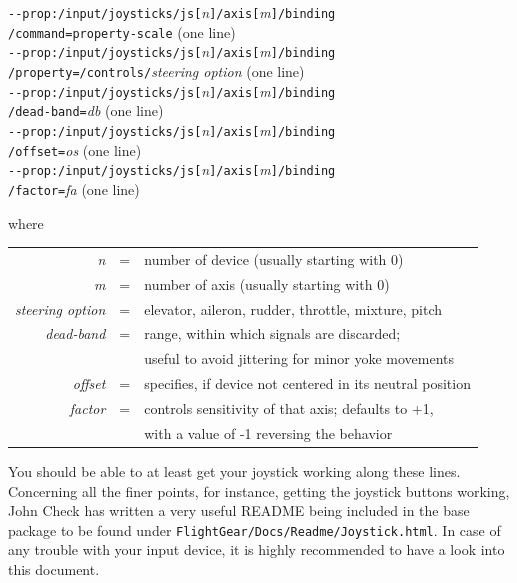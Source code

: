\noindent
\texttt{-$ $-prop:/input/joysticks/js[}\textit{n}\texttt{]/axis[}\textit{m}\texttt{]/binding}\\
\texttt{/command=property-scale} (one line)\\
\texttt{-$ $-prop:/input/joysticks/js[}\textit{n}\texttt{]/axis[}\textit{m}\texttt{]/binding}\\
\texttt{/property=/controls/}\textit{steering option} (one line)\\
\texttt{-$ $-prop:/input/joysticks/js[}\textit{n}\texttt{]/axis[}\textit{m}\texttt{]/binding}\\
\texttt{/dead-band=}\textit{db} (one line)\\
\texttt{-$ $-prop:/input/joysticks/js[}\textit{n}\texttt{]/axis[}\textit{m}\texttt{]/binding}\\
\texttt{/offset=}\textit{os} (one line)\\
\texttt{-$ $-prop:/input/joysticks/js[}\textit{n}\texttt{]/axis[}\textit{m}\texttt{]/binding}\\
\texttt{/factor=}\textit{fa} (one line)\\
\medskip

 \noindent
 where
 \medskip

\begin{tabular}{rcl}
 \textit{n} &=& number of device (usually starting with 0)\\
 \textit{m} &=& number of axis (usually starting with 0)\\
 \textit{steering option} &=& elevator, aileron, rudder, throttle, mixture, pitch\\
 \textit{dead-band} &=& range, within which signals are discarded;\\
                   && useful to avoid jittering for minor yoke movements\\
 \textit{offset} &=& specifies, if device not centered in its neutral position\\
  \textit{factor} &=& controls sensitivity of that axis; defaults to +1,\\ 
                 &&with a value of -1 reversing the behavior
  \end{tabular}
 \medskip

You should be able to at least get your joystick working along
these lines. Concerning all the finer points, for instance, getting the joystick buttons
working, John Check has written a very useful README being included in the base package to be found under \texttt{FlightGear/Docs/Readme/Joystick.html}. In case of any trouble with your input device, it is highly recommended to have a look into this document.

